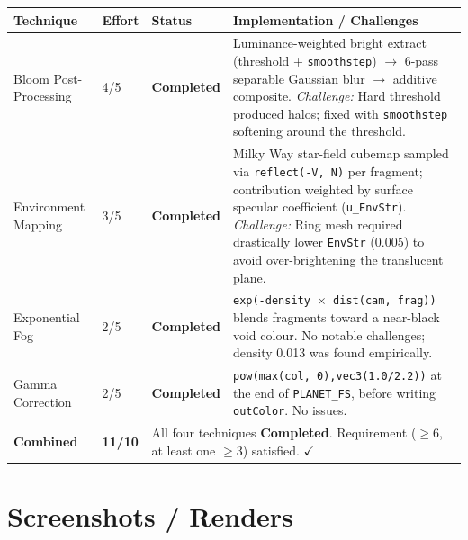 \documentclass[11pt,a4paper]{article}
\newcommand{\Done}{\textcolor{done}{\textbf{Completed}}}
\begin{document}
\smallskip
\begin{tabular}{@{}p{4.2cm}p{1.2cm}p{2.4cm}p{7.4cm}@{}}
\toprule
Technique & Effort & Status & Implementation / Challenges \\
\midrule
Bloom Post-Processing & 4/5 & \Done
  & Luminance-weighted bright extract (threshold + \texttt{smoothstep})
    $\to$ 6-pass separable Gaussian blur $\to$ additive composite.
    \textit{Challenge:} Hard threshold produced halos; fixed with
    \texttt{smoothstep} softening around the threshold. \\[3pt]
Environment Mapping   & 3/5 & \Done
  & Milky Way star-field cubemap sampled via \texttt{reflect(-V,\,N)}
    per fragment; contribution weighted by surface specular coefficient
    (\texttt{u\_EnvStr}).
    \textit{Challenge:} Ring mesh required drastically lower \texttt{EnvStr}
    (0.005) to avoid over-brightening the translucent plane. \\[3pt]
Exponential Fog       & 2/5 & \Done
  & \texttt{exp(-density $\times$ dist(cam, frag))} blends fragments
    toward a near-black void colour.
    No notable challenges; density 0.013 was found empirically. \\[3pt]
Gamma Correction      & 2/5 & \Done
  & \texttt{pow(max(col,\,0),\;vec3(1.0/2.2))} at the end of
    \texttt{PLANET\_FS}, before writing \texttt{outColor}.
    No issues. \\[3pt]
\midrule
\textbf{Combined} & \textbf{11/10}
  & \multicolumn{2}{l}{All four techniques \Done.
    Requirement ($\geq 6$, at least one $\geq 3$) satisfied. $\checkmark$} \\
\bottomrule
\end{tabular}

\section{Screenshots / Renders}
\end{document}
